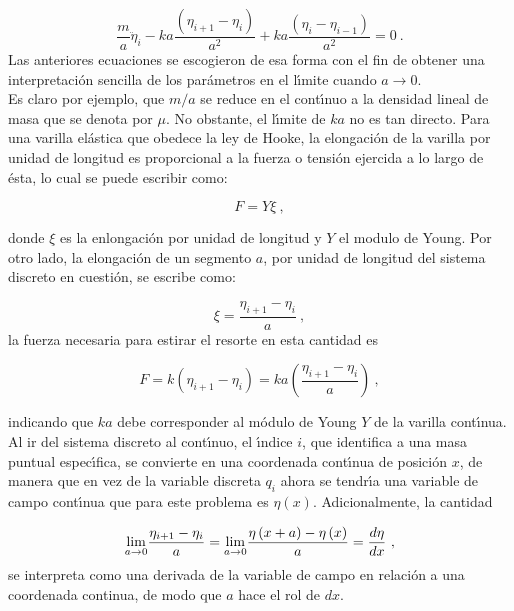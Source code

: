 \begin{equation}
\frac{m}{a}\ddot{\eta}_{i}-ka\frac{\left(\eta _{i+1}-\eta_{i}\right)}{a^{2}}+ka\frac{\left( \eta_{i}-\eta _{i-1}\right) }{a^{2}}=0~.
\label{2.17g}
\end{equation}
\noindent
Las anteriores ecuaciones se escogieron de esa forma con el fin de obtener una interpretaci\'{o}n sencilla de los par\'{a}metros en el l\'{\i}mite cuando $a\rightarrow 0$.\\
Es claro por ejemplo, que $m/a$ se reduce en el cont\'{\i}nuo a la densidad lineal de masa que se denota por $\mu$. No obstante, el l\'{\i}mite de $ka$ no es tan directo. Para una varilla el\'{a}stica que obedece la ley de Hooke, la elongaci\'{o}n de la varilla por unidad de longitud es proporcional a la fuerza o tensi\'{o}n ejercida a lo largo de \'{e}sta, lo cual se puede escribir como:

\begin{equation*}
F=Y\xi ~,
\end{equation*}

\noindent
donde $\xi $ es la enlongaci\'{o}n por unidad de longitud y $Y$ el modulo de Young. Por otro lado, la elongaci\'{o}n de un segmento $a$, por unidad de longitud del sistema discreto en cuesti\'{o}n, se escribe como:

\begin{equation*}
\xi =\frac{\eta _{i+1}-\eta _{i}}{a}~,
\end{equation*}
\noindent
la fuerza necesaria para estirar el resorte en esta cantidad es

\begin{equation}
F=k\left( \eta _{i+1}-\eta _{i}\right) =ka\left( \frac{\eta _{i+1}-\eta _{i}%
}{a}\right) ~,
\end{equation}

\noindent
indicando que $ka$ debe corresponder al m\'{o}dulo de Young $Y$ de la varilla cont\'{\i}nua. Al ir del sistema discreto al cont\'{\i}nuo, el \'{\i}ndice $i$, que identifica a una masa puntual espec\'{\i}fica, se convierte en una coordenada cont\'{\i}nua de posici\'{o}n $x$, de manera que en vez de la variable discreta $q_{i}$ ahora se tendr\'{\i}a una
variable de campo cont\'{\i}nua que para este problema es $\eta (x)$. Adicionalmente, la cantidad

\begin{equation}
\underset{a\rightarrow 0}{\lim }\frac{\eta _{i+1}-\eta _{i}}{a}=\underset{%
a\rightarrow 0}{\lim }\frac{\eta \left( x+a\right) -\eta \left( x\right) }{a}%
=\frac{d\eta }{dx}~,
\end{equation}
\noindent
se interpreta como una derivada de la variable de campo en relaci\'{o}n a una coordenada continua, de modo que $a$ hace el rol de $dx$.\\

